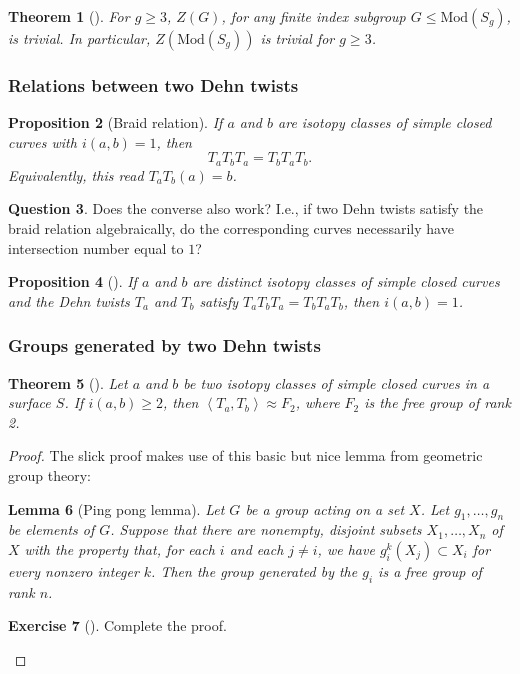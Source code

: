 \documentclass[reqno]{amsart}
\newtheorem{theorem}{Theorem}[section]
\newtheorem{lemma}[theorem]{Lemma}
\newtheorem{proposition}[theorem]{Proposition}
\theoremstyle{definition}
\newtheorem{exercise}[theorem]{Exercise}
\newtheorem{question}[theorem]{Question}
\theoremstyle{remark}
\newcommand{\Mod}{{\mathrm{Mod}}}
\begin{document}
\begin{theorem}[]
    For $g \ge 3$, $Z\left( G \right) $, for
    any finite index subgroup $G \le \Mod (S_g)$, is trivial.
    In particular, $Z\left( \Mod(S_g) \right) $ is trivial
    for $g\ge 3$.
\end{theorem}

\subsubsection{Relations between two Dehn twists}

\begin{proposition}[Braid relation]
    If $a$ and $b$ are isotopy classes of simple closed
    curves with $i(a,b) = 1$, then
    \[
    T_a T_b T_a = T_b T_a T_b.
    \] 
    Equivalently, this read
    $T_a T_b(a) = b$.
\end{proposition}

\begin{question}
    Does the converse also work? I.e., if two Dehn twists
    satisfy the braid relation algebraically, do the
    corresponding curves necessarily have intersection
    number equal to $1$?
\end{question}

\begin{proposition}[]
    If $a$ and $b$ are distinct isotopy classes of simple closed
    curves and the Dehn twists $T_a$ and $T_b$ satisfy
    $T_a T_b T_a = T_b T_a T_b$, then
    $i(a,b) = 1$.
\end{proposition}

\subsubsection*{Groups generated by two Dehn twists}

\begin{theorem}[]
    Let $a$ and $b$ be two isotopy classes of simple closed
    curves in a surface $S$. If $i(a,b) \ge 2$, then
    $\left<T_a ,T_b \right> \approx F_2$, where
    $F_2$ is the free group of rank 2.
\end{theorem}

\begin{proof}
   The slick proof makes use of this basic but nice
   lemma from geometric group theory:

\begin{lemma}[Ping pong lemma]
    Let $G$ be a group acting on a set $X$. Let
    $g_1, \ldots, g_n$ be elements of $G$. Suppose
    that there are nonempty, disjoint subsets $X_1, \ldots,
    X_n$ of $X$ with the property that, for each
    $i$ and each $j\neq i$, we have
    $g_i^{k} \left( X_j  \right) \subset X_i$ for every
    nonzero integer $k$. Then the group generated
    by the $g_i$ is a free group of rank $n$.
\end{lemma}

\begin{exercise}[]
    Complete the proof.
\end{exercise}


\end{proof}
\end{document}
